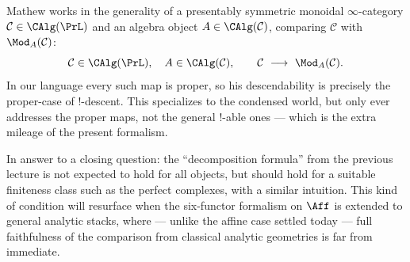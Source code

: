 \begin{remark}
\label{rmk:18:mathew-general}
Mathew works in the generality of a presentably symmetric monoidal
$\infty$-category $\mathcal C\in\CAlg(\PrL)$ and an algebra object
$A\in\CAlg(\mathcal C)$, comparing $\mathcal C$ with $\Mod_A(\mathcal C)$:
\begin{equation*}
\mathcal C\in\CAlg(\PrL),\quad A\in\CAlg(\mathcal C),\qquad \mathcal C\ \longrightarrow\ \Mod_A(\mathcal C).
\end{equation*}
In our language every such map is proper, so his descendability is precisely the
proper-case of $!$-descent. This specializes to the condensed world, but only ever
addresses the proper maps, not the general $!$-able ones --- which is the extra
mileage of the present formalism.
\end{remark}

\begin{remark}
\label{rmk:18:decomposition}
In answer to a closing question: the ``decomposition formula'' from the previous
lecture is not expected to
hold for all objects, but should hold for a suitable finiteness class such as the
perfect complexes, with a similar intuition. This kind of condition will resurface
when the six-functor formalism on $\Aff$ is extended to general analytic stacks,
where --- unlike the affine case settled today --- full faithfulness of the
comparison from classical analytic geometries is far from immediate.
\end{remark}
